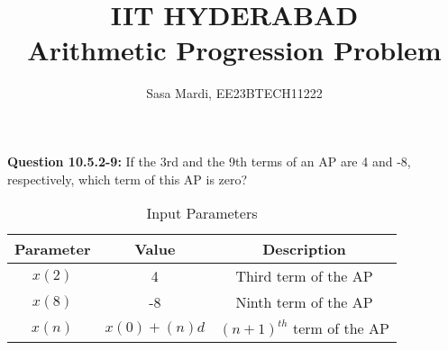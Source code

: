 \documentclass[journal,12pt,twocolumn]{IEEEtran}
\theoremstyle{remark}
\begin{document}
\title{IIT HYDERABAD \\Arithmetic Progression Problem}
\author{Sasa Mardi, EE23BTECH11222}
\date{}
\maketitle
\textbf{Question 10.5.2-9:}
If the 3rd and the 9th terms of an AP are 4 and -8, respectively, which term of this AP is zero? \\
\solution
\begin{table}[h!]
    \centering
    \caption{Input Parameters}
    \label{tab:1}
    \begin{tabular}{ | c | c | c | }
        \hline
        Parameter & Value & Description \\
        \hline
        $x(2)$ & 4 & Third term of the AP \\
        \hline
        $x(8)$ & -8 & Ninth term of the AP \\
        \hline
         $x(n)$ & $x(0) + (n)d$ & ${(n+1)}^{th}$ term of the AP \\
        \hline
    \end{tabular}
\end{table}
\end{document}
